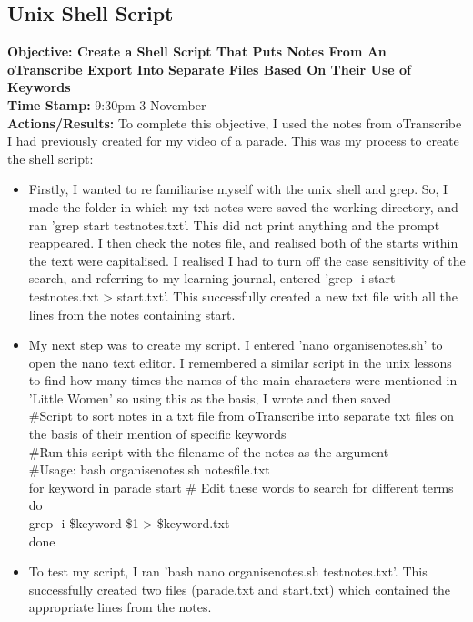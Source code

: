 \documentclass{article}
\begin{document}
\begin{FlushLeft}
\pagebreak

\subsection{Unix Shell Script}
\textbf{Objective: Create a Shell Script That Puts Notes From An oTranscribe Export Into Separate Files Based On Their Use of Keywords}\\
\textbf{Time Stamp:} 9:30pm 3 November\\
\textbf{Actions/Results:} To complete this objective, I used the notes from oTranscribe I had previously created for my video of a parade. This was my process to create the shell script:
\begin{itemize}
    \item Firstly, I wanted to re familiarise myself with the unix shell and grep. So, I made the folder in which my txt notes were saved the working directory, and ran 'grep start test\textunderscore notes.txt'. This did not print anything and the prompt reappeared. I then check the notes file, and realised both of the starts within the text were capitalised. I realised I had to turn off the case sensitivity of the search, and referring to my learning journal, entered 'grep -i start test\textunderscore notes.txt \textgreater{} start.txt'. This successfully created a new txt file with all the lines from the notes containing start.
    \item My next step was to create my script. I entered 'nano organise\textunderscore notes.sh' to open the nano text editor. I remembered a similar script in the unix lessons to find how many times the names of the main characters were mentioned in 'Little Women' so using this as the basis, I wrote and then saved\\
    \#Script to sort notes in a txt file from oTranscribe into separate txt files on the basis of their mention of specific keywords\\
    \#Run this script with the filename of the notes as the argument\\
    \#Usage: bash organise\textunderscore notes.sh notesfile.txt\\
    for keyword in parade start \# Edit these words to search for different terms\\
    do\\
    grep -i \$keyword \$1 \textgreater{} \$keyword.txt\\
    done
    \item To test my script, I ran 'bash nano organise\textunderscore notes.sh test\textunderscore notes.txt'. This successfully created two files (parade.txt and start.txt) which contained the appropriate lines from the notes.

\end{itemize}
\end{FlushLeft}
\end{document}

